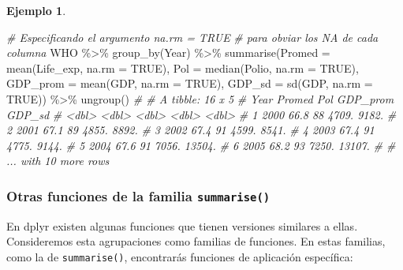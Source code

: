 \documentclass[
]{article}
\newenvironment{Shaded}{\begin{snugshade}}{\end{snugshade}}
\newcommand{\AttributeTok}[1]{\textcolor[rgb]{0.77,0.63,0.00}{#1}}
\newcommand{\CommentTok}[1]{\textcolor[rgb]{0.56,0.35,0.01}{\textit{#1}}}
\newcommand{\ConstantTok}[1]{\textcolor[rgb]{0.00,0.00,0.00}{#1}}
\newcommand{\FunctionTok}[1]{\textcolor[rgb]{0.00,0.00,0.00}{#1}}
\newcommand{\NormalTok}[1]{#1}
\newcommand{\SpecialCharTok}[1]{\textcolor[rgb]{0.00,0.00,0.00}{#1}}
\theoremstyle{definition}
\theoremstyle{definition}
\newtheorem{example}{Ejemplo}[section]
\theoremstyle{definition}
\theoremstyle{definition}
\theoremstyle{remark}
\begin{document}
\begin{example}
\begin{Shaded}
\begin{Highlighting}[]
\CommentTok{\# Especificando el argumento na.rm = TRUE }
\CommentTok{\# para obviar los NA de cada columna}
\NormalTok{WHO }\SpecialCharTok{\%\textgreater{}\%} 
  \FunctionTok{group\_by}\NormalTok{(Year) }\SpecialCharTok{\%\textgreater{}\%} 
  \FunctionTok{summarise}\NormalTok{(}\AttributeTok{Promed =} \FunctionTok{mean}\NormalTok{(Life\_exp, }\AttributeTok{na.rm =} \ConstantTok{TRUE}\NormalTok{),}
            \AttributeTok{Pol =} \FunctionTok{median}\NormalTok{(Polio, }\AttributeTok{na.rm =} \ConstantTok{TRUE}\NormalTok{),}
            \AttributeTok{GDP\_prom =} \FunctionTok{mean}\NormalTok{(GDP, }\AttributeTok{na.rm =} \ConstantTok{TRUE}\NormalTok{),}
            \AttributeTok{GDP\_sd =} \FunctionTok{sd}\NormalTok{(GDP, }\AttributeTok{na.rm =} \ConstantTok{TRUE}\NormalTok{)) }\SpecialCharTok{\%\textgreater{}\%} 
  \FunctionTok{ungroup}\NormalTok{()}
\CommentTok{\# \# A tibble: 16 x 5}
\CommentTok{\#    Year Promed   Pol GDP\_prom GDP\_sd}
\CommentTok{\#   \textless{}dbl\textgreater{}  \textless{}dbl\textgreater{} \textless{}dbl\textgreater{}    \textless{}dbl\textgreater{}  \textless{}dbl\textgreater{}}
\CommentTok{\# 1  2000   66.8    88    4709.  9182.}
\CommentTok{\# 2  2001   67.1    89    4855.  8892.}
\CommentTok{\# 3  2002   67.4    91    4599.  8541.}
\CommentTok{\# 4  2003   67.4    91    4775.  9144.}
\CommentTok{\# 5  2004   67.6    91    7056. 13504.}
\CommentTok{\# 6  2005   68.2    93    7250. 13107.}
\CommentTok{\# \# ... with 10 more rows}
\end{Highlighting}
\end{Shaded}

\end{example}

\hypertarget{otras-funciones-de-la-familia-summarise}{%
\subsubsection{\texorpdfstring{Otras funciones de la familia \texttt{summarise()}}{Otras funciones de la familia summarise()}}\label{otras-funciones-de-la-familia-summarise}}

En dplyr existen algunas funciones que tienen versiones similares a ellas. Consideremos esta agrupaciones como familias de funciones. En estas familias, como la de \texttt{summarise()}, encontrarás funciones de aplicación específica:
\end{document}
